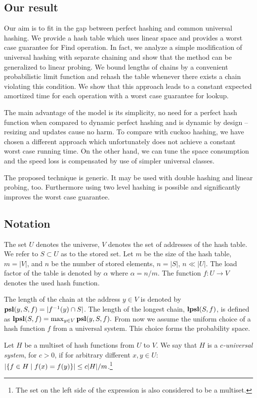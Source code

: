 \subsection{Our result}
Our aim is to fit in the gap between perfect hashing and common universal hashing.
We provide a hash table which uses linear space and provides a worst case guarantee for Find operation.
In fact, we analyze a simple modification of universal hashing with separate chaining and show that the method can be generalized to linear probing.
We bound lengths of chains by a convenient probabilistic limit function and rehash the table whenever there exists a chain violating this condition.
We show that this approach leads to a constant expected amortized time for each operation with a worst case guarantee for lookup.

The main advantage of the model is its simplicity, no need for a perfect hash function when compared to dynamic perfect hashing and is dynamic by design -- resizing and updates cause no harm.
To compare with cuckoo hashing, we have chosen a different approach which unfortunately does not achieve a constant worst case running time.
On the other hand, we can tune the space consumption and the speed loss is compensated by use of simpler universal classes.

The proposed technique is generic. It may be used with double hashing and linear probing, too. 
Furthermore using two level hashing is possible and significantly improves the worst case guarantee.

\subsection{Notation}
The set $U$ denotes the universe, $V$ denotes the set of addresses of the hash table.
We refer to $S \subset U$ as to the stored set.
Let $m$ be the size of the hash table, $m = |V|$, and $n$ be the number of stored elements, $n = |S|$, $n \ll |U|$. 
The load factor of the table is denoted by $\alpha$ where $\alpha = {n}/{m}$.
The function $f\colon U \rightarrow V$ denotes the used hash function. 

The length of the chain at the address $y \in V$ is denoted by $\mathbf{psl}(y, S, f) = |f^{-1}(y) \cap S|$. 
The length of the longest chain, $\mathbf{lpsl}(S, f)$, is defined as $\mathbf{lpsl}(S, f) = \max_{y \in V} \mathbf{psl}(y, S, f).$
From now we assume the uniform choice of a hash function $f$ from a universal system. 
This choice forms the probability space.

\begin{definition}
\label{definition-c-universal-system}
Let $H$ be a multiset of hash functions from $U$ to $V$. We say that $H$ is a \emph{$c$-universal system}, for $c > 0$, if for arbitrary different $x, y \in U$: $\left|\lbrace f \in H \mid f(x) = f(y) \rbrace\right| \leq {c|H|}/{m}$.\footnote{The set on the left side of the expression is also considered to be a multiset.}
\end{definition}

